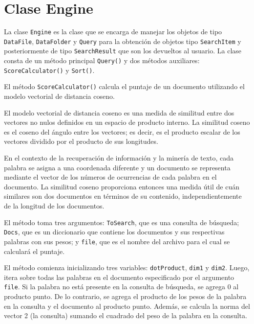 \documentclass[12pt,a4paper]{report}
\begin{document}
\chapter*{Clase Engine}

La clase \texttt{Engine} es la clase que se encarga de manejar los objetos de tipo \texttt{DataFile}, \texttt{DataFolder} y \texttt{Query} para la obtención de objetos tipo \texttt{SearchItem} y posteriormente de tipo \texttt{SearchResult} que son los devueltos al usuario.
La clase consta de un método principal \texttt{Query()} y dos métodos auxiliares: \texttt{ScoreCalculator()} y \texttt{Sort()}.

El método \texttt{ScoreCalculator()} calcula el puntaje de un documento utilizando el modelo vectorial de distancia coseno.\par

El modelo vectorial de distancia coseno es una medida de similitud entre dos vectores no nulos definidos en un espacio de producto interno. La similitud coseno es el coseno del ángulo entre los vectores; es decir, es el producto escalar de los vectores dividido por el producto de sus longitudes.\par

En el contexto de la recuperación de información y la minería de texto, cada palabra se asigna a una coordenada diferente y un documento se representa mediante el vector de los números de ocurrencias de cada palabra en el documento. La similitud coseno proporciona entonces una medida útil de cuán similares son dos documentos en términos de su contenido, independientemente de la longitud de los documentos.\par

El método toma tres argumentos: \texttt{ToSearch}, que es una consulta de búsqueda; \texttt{Docs}, que es un diccionario que contiene los documentos y sus respectivas palabras con sus pesos; y \texttt{file}, que es el nombre del archivo para el cual se calculará el puntaje.\par

El método comienza inicializando tres variables: \texttt{dotProduct}, \texttt{dim1} y \texttt{dim2}. Luego, itera sobre todas las palabras en el documento especificado por el argumento \texttt{file}. Si la palabra no está presente en la consulta de búsqueda, se agrega 0 al producto punto. De lo contrario, se agrega el producto de los pesos de la palabra en la consulta y el documento al producto punto. Además, se calcula la norma del vector 2 (la consulta) sumando el cuadrado del peso de la palabra en la consulta.\par
\end{document}
